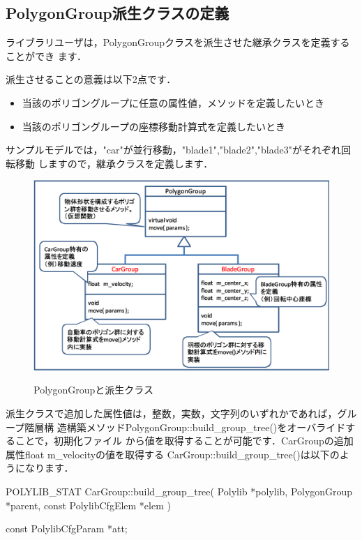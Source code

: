 {%
\subsection{PolygonGroup派生クラスの定義}

ライブラリユーザは，PolygonGroupクラスを派生させた継承クラスを定義することができ
ます．

派生させることの意義は以下2点です．

\begin{itemize}
 \item 当該のポリゴングループに任意の属性値，メソッドを定義したいとき
 \item 当該のポリゴングループの座標移動計算式を定義したいとき
\end{itemize}

サンプルモデルでは，"car"が並行移動，"blade1","blade2","blade3"がそれぞれ回転移動
しますので，継承クラスを定義します．

\begin{figure}[H]
 \centering
 \includegraphics[width=13cm]{clip010.eps}\\
 \caption{PolygonGroupと派生クラス}
\end{figure}

派生クラスで追加した属性値は，整数，実数，文字列のいずれかであれば，グループ階層構
造構築メソッドPolygonGroup::build\_group\_tree()をオーバライドすることで，初期化ファイル
から値を取得することが可能です．CarGroupの追加属性float m\_velocityの値を取得する
CarGroup::build\_group\_tree()は以下のようになります．

\begin{program}
POLYLIB_STAT CarGroup::build_group_tree(
	Polylib			*polylib,
	PolygonGroup		*parent,
	const PolylibCfgElem	*elem
) {
	const PolylibCfgParam *att;

}
\end{program}}

